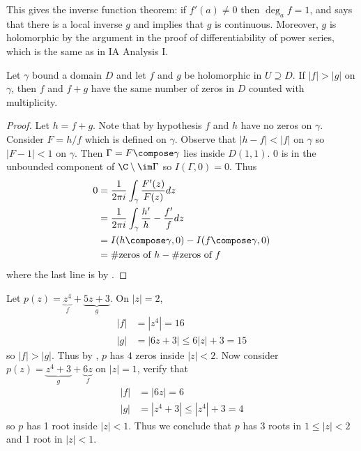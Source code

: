 \documentclass[a4paper]{article}
\begin{document}
\begin{remark}
  This gives the inverse function theorem: if \(f'(a) \neq 0\) then \(\deg_a f = 1\), and  says that there is a local inverse \(g\) and  implies that \(g\) is continuous. Moreover, \(g\) is holomorphic by the argument in the proof of differentiability of power series, which is the same as in IA Analysis I.
\end{remark}

\begin{theorem}[Rouché]
  \label{thm:Rouche}
  Let \(\gamma\) bound a domain \(D\) and let \(f\) and \(g\) be holomorphic in \(U \supseteq D\). If \(|f| > |g|\) on \(\gamma\), then \(f\) and \(f + g\) have the same number of zeros in \(D\) counted with multiplicity.
\end{theorem}

\begin{proof}
  Let \(h = f + g\). Note that by hypothesis \(f\) and \(h\) have no zeros on \(\gamma\). Consider \(F = h/f\) which is defined on \(\gamma\). Observe that \(|h - f| < |f|\) on \(\gamma\) so \(|F - 1| < 1\) on \(\gamma\). Then \(\Gamma = F \compose \gamma\) lies inside \(D(1, 1)\). \(0\) is in the unbounded component of \(\C \setminus \im \Gamma\) so \(I(\Gamma, 0) = 0\). Thus
  \begin{align*}
    0
    &= \frac{1}{2\pi i} \int_\gamma \frac{F'(z)}{F(z)} dz \\
    &= \frac{1}{2\pi i} \int_\gamma \frac{h'}{h} - \frac{f'}{f} dz \\
    &= I(h \compose \gamma, 0) - I(f \compose \gamma, 0) \\
    &= \#\text{zeros of } h - \#\text{zeros of } f
  \end{align*}
  where the last line is by .
\end{proof}

\begin{eg}
  Let \(p(z) = \underbrace{z^4}_f + \underbrace{5z + 3}_g\). On \(|z| = 2\),
  \begin{align*}
    |f| &= |z^4| = 16 \\
    |g| &= |6z + 3| \leq 6|z| + 3 = 15
  \end{align*}
  so \(|f| > |g|\). Thus by , \(p\) has \(4\) zeros inside \(|z| < 2\). Now consider \(p(z) = \underbrace{z^4 + 3}_g + \underbrace{6z}_f\) on \(|z| = 1\), verify that
  \begin{align*}
    |f| &= |6z| = 6 \\
    |g| &= |z^4 + 3| \leq |z^4| + 3 = 4
  \end{align*}
  so \(p\) has 1 root inside \(|z| < 1\). Thus we conclude that \(p\) has 3 roots in \(1 \leq |z| < 2\) and 1 root in \(|z| < 1\).
\end{eg}

\printindex

\iffalse
past lecture notes:
T. Scholl, K. Carne

Book
Ahlfors, Complex Analysis
\fi
\end{document}
